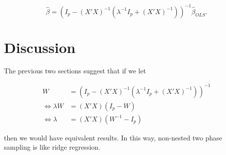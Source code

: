 \documentclass[12pt]{article}
\begin{document}
$$\hat \beta = (I_p - (X'X)^{-1}(\lambda^{-1}I_p + (X'X)^{-1}))^{-1} \hat \beta_{OLS}.$$

\section{Discussion}

The previous two sections suggest that if we let

$$
\begin{aligned}
  W &= (I_p - (X'X)^{-1}(\lambda^{-1}I_p + (X'X)^{-1}))^{-1} \\
  \iff \lambda W &= (X'X)(I_p - W) \\ 
  \iff \lambda &= (X'X)(W^{-1} - I_p)
\end{aligned}
$$

then we would have equivalent results. In this way, non-nested two phase
sampling is like ridge regression.
\end{document}
